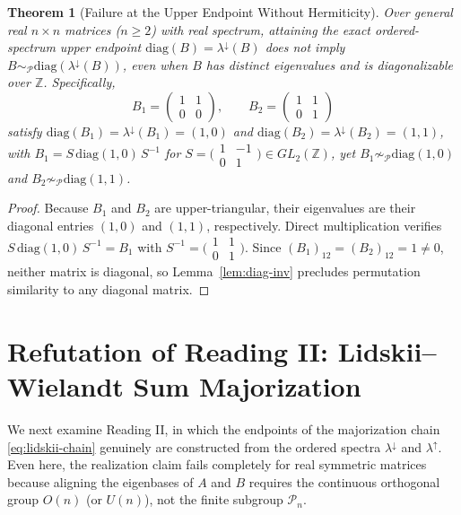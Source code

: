 \documentclass[11pt]{article}
\newtheorem{theorem}{Theorem}[section]
\theoremstyle{definition}
\theoremstyle{remark}
\newcommand{\Z}{\mathbb{Z}}
\newcommand{\Pn}{\mathcal{P}_n}
\newcommand{\On}{O(n)}
\newcommand{\Un}{U(n)}
\newcommand{\diag}{\mathrm{diag}}
\begin{document}
\begin{theorem}[Failure at the Upper Endpoint Without Hermiticity]
\label{thm:reading-i-upper}
Over general real $n \times n$ matrices ($n \ge 2$) with real spectrum, attaining
the exact ordered-spectrum upper endpoint $\diag(B) = \lambda^\downarrow(B)$ does
not imply $B \sim_{\mathcal{P}} \diag(\lambda^\downarrow(B))$, even when $B$ has
distinct eigenvalues and is diagonalizable over $\Z$. Specifically,
\[
  B_1 = \begin{pmatrix} 1 & 1 \\ 0 & 0 \end{pmatrix},
  \qquad
  B_2 = \begin{pmatrix} 1 & 1 \\ 0 & 1 \end{pmatrix}
\]
satisfy $\diag(B_1) = \lambda^\downarrow(B_1) = (1,0)$ and
$\diag(B_2) = \lambda^\downarrow(B_2) = (1,1)$, with
$B_1 = S\,\diag(1,0)\,S^{-1}$ for
$S = \bigl(\begin{smallmatrix} 1 & -1 \\ 0 & 1 \end{smallmatrix}\bigr) \in GL_2(\Z)$,
yet $B_1 \not\sim_{\mathcal{P}} \diag(1,0)$ and
$B_2 \not\sim_{\mathcal{P}} \diag(1,1)$.
\end{theorem}
\begin{proof}
Because $B_1$ and $B_2$ are upper-triangular, their eigenvalues are their diagonal
entries $(1,0)$ and $(1,1)$, respectively. Direct multiplication verifies
$S\,\diag(1,0)\,S^{-1} = B_1$ with $S^{-1} =
\bigl(\begin{smallmatrix} 1 & 1 \\ 0 & 1 \end{smallmatrix}\bigr)$. Since
$(B_1)_{12} = (B_2)_{12} = 1 \neq 0$, neither matrix is diagonal, so
Lemma~\ref{lem:diag-inv} precludes permutation similarity to any diagonal matrix.
\end{proof}

\section{Refutation of Reading II: Lidskii--Wielandt Sum Majorization}
\label{sec:reading-ii}

We next examine Reading II, in which the endpoints of the majorization chain
\eqref{eq:lidskii-chain} genuinely are constructed from the ordered spectra
$\lambda^\downarrow$ and $\lambda^\uparrow$. Even here, the realization claim
fails completely for real symmetric matrices because aligning the eigenbases of
$A$ and $B$ requires the continuous orthogonal group $\On$ (or $\Un$), not the
finite subgroup $\Pn$.
\end{document}
